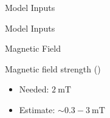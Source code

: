 %     

\begin{frame}{Model Inputs}

    
\end{frame}

\begin{frame}{Model Inputs}
    
\end{frame}

\begin{frame}{Magnetic Field}
\begin{block}{Magnetic field strength {\tiny (\cite{Wardle07})}}
    \begin{itemize}
        \item Needed: $2\ \mathrm{mT}$
        \item Estimate: $\sim 0.3-3\ \mathrm{mT}$
    \end{itemize}
\end{block}
\end{frame}